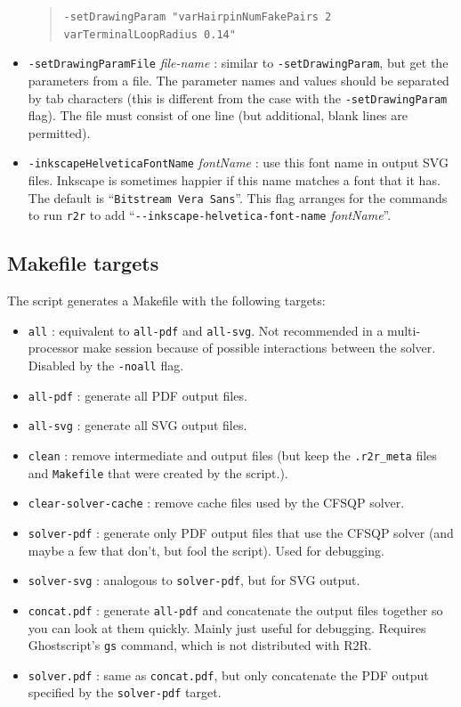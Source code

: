 \documentclass[letterpaper,12pt]{report}
\newcommand{\example}[1]{
\begin{quote}
{\raggedright
#1
}
\end{quote}
}
\newcommand{\examplett}[1]{
\example{{\tt #1}}
}
\begin{document}
\begin{itemize}
  \examplett{-setDrawingParam "varHairpinNumFakePairs 2 varTerminalLoopRadius 0.14"}
\item {\tt -setDrawingParamFile} {\it file-name} : similar to {\tt -setDrawingParam}, but get the parameters from a file.  The parameter names and values should be separated by tab characters (this is different from the case with the {\tt -setDrawingParam} flag).  The file must consist of one line (but additional, blank lines are permitted).
\item {\tt -inkscapeHelveticaFontName} {\it fontName} : use this font name in output SVG files.  Inkscape is sometimes happier if this name matches a font that it has.  The default is ``{\tt Bitstream Vera Sans}''.  This flag arranges for the commands to run {\tt r2r} to add ``{\tt -{}-inkscape-helvetica-font-name} {\it fontName}''.
\end{itemize}

\subsection{Makefile targets}

The script generates a Makefile with the following targets:
\begin{itemize}
\item {\tt all} : equivalent to {\tt all-pdf} and {\tt all-svg}.  Not recommended in a multi-processor make session because of possible interactions between the solver.  Disabled by the {\tt -noall} flag.
\item {\tt all-pdf} : generate all PDF output files.
\item {\tt all-svg} : generate all SVG output files.
\item {\tt clean} : remove intermediate and output files (but keep the {\tt .r2r\_meta} files and {\tt Makefile} that were created by the script.).
\item {\tt clear-solver-cache} : remove cache files used by the CFSQP solver.
\item {\tt solver-pdf} : generate only PDF output files that use the CFSQP solver (and maybe a few that don't, but fool the script).  Used for debugging.
\item {\tt solver-svg} : analogous to {\tt solver-pdf}, but for SVG output.
\item {\tt concat.pdf} : generate {\tt all-pdf} and concatenate the output files together so you can
look at them quickly.  Mainly just useful for debugging.  Requires Ghostscript's {\tt gs} command, which is not distributed
with R2R.
\item {\tt solver.pdf} : same as {\tt concat.pdf}, but only concatenate the PDF output specified by the {\tt solver-pdf} target.
\end{itemize}
\end{document}
